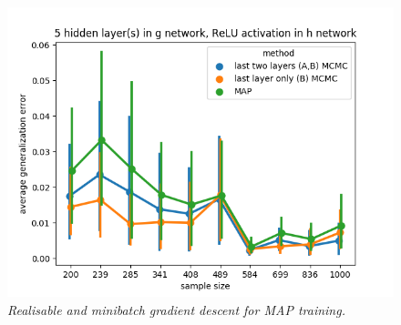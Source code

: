 \documentclass[11pt]{article}
\numberwithin{equation}{section}
\theoremstyle{plain}
\theoremstyle{definition}
\begin{document}
\begin{figure}[t!]
\begin{center}
		\includegraphics[scale=0.45]{taskid15.png}
	\end{center}
	\caption{\textit{Realisable and minibatch gradient descent for MAP training.}}
	\label{fig:avg_gen_err_minibatch_realisable}
\end{figure}


\begin{table}[h!]%
	\caption{Companion to Figure \ref{fig:avg_gen_err_minibatch_realisable}.}%
	\label{table::avg_gen_err_minibatch_realisable}%
	\begin{tiny}
		\begin{subtable}[t]{.5\linewidth}
			\caption{1 hidden layer(s) in $g$, identity activation in $h$}
			
		\end{subtable}
		\hspace{2em}
		\begin{subtable}[t]{.5\linewidth}
			\caption{5 hidden layer(s) in $g$, identity activation in $h$}
			
		\end{subtable}
		\begin{subtable}[t]{.5\linewidth}
			\caption{1 hidden layer(s) in $g$, ReLU activation in $h$}
			
		\end{subtable}
		\hspace{2em}
		\begin{subtable}[t]{.5\linewidth}
			\caption{5 hidden layer(s) in $g$, ReLU activation in $h$}
			
		\end{subtable}
	\end{tiny}
\end{table}
\end{document}
